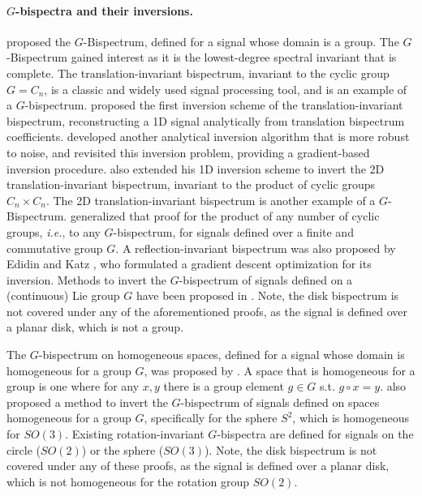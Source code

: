 \paragraph{$G$-bispectra and their inversions.} \citet{kakarala_thesis} proposed the $G$-Bispectrum, defined for a signal whose domain is a group. The $G$-Bispectrum gained interest as it is the lowest-degree spectral invariant that is complete. The translation-invariant bispectrum, invariant to the cyclic group $G=C_n$, is a classic and widely used signal processing tool, and is an example of a $G$-bispectrum. \cite{giannakis1989} proposed the first inversion scheme of the translation-invariant bispectrum, reconstructing a 1D signal analytically from translation bispectrum coefficients. \cite{sundaramoorthy1990} developed another analytical inversion algorithm that is more robust to noise, and \cite{pinilla2023} revisited this inversion problem, providing a gradient-based inversion procedure. \cite{giannakis1989} also extended his 1D inversion scheme to invert the 2D translation-invariant bispectrum, invariant to the product of cyclic groups $C_n \times C_n$. The 2D translation-invariant bispectrum is another example of a $G$-Bispectrum.  \cite{ mataigne2024selective} generalized that proof for the product of any number of cyclic groups, \textit{i.e.}, to any $G$-bispectrum, for signals defined over a finite and commutative group $G$. A reflection-invariant bispectrum was also proposed by Edidin and Katz \cite{edidin2025}, who formulated a gradient descent optimization for its inversion. Methods to invert the $G$-bispectrum of signals defined on a (continuous) Lie group $G$ have been proposed in \cite{kakarala2012,kakarala1993}. Note, the disk bispectrum is not covered under any of the aforementioned proofs, as the signal is defined over a planar disk, which is not a group.

The $G$-bispectrum on homogeneous spaces, defined for a signal whose domain is homogeneous for a group $G$, was proposed by \cite{kakarala2012bispectrumsourcephasesensitiveinvariants}. A space that is homogeneous for a group is one where for any $x, y$ there is a group element $g \in G$ s.t. $g \circ x = y$. \cite{kakarala2012bispectrumsourcephasesensitiveinvariants} also proposed a method to invert the $G$-bispectrum of signals defined on spaces homogeneous for a group $G$, specifically for the sphere $S^2$, which is homogeneous for $SO(3)$. Existing rotation-invariant $G$-bispectra are defined for signals on the circle ($SO(2)$) or the sphere ($SO(3)$). Note, the disk bispectrum is not covered under any of these proofs, as the signal is defined over a planar disk, which is not homogeneous for the rotation group $SO(2)$.

